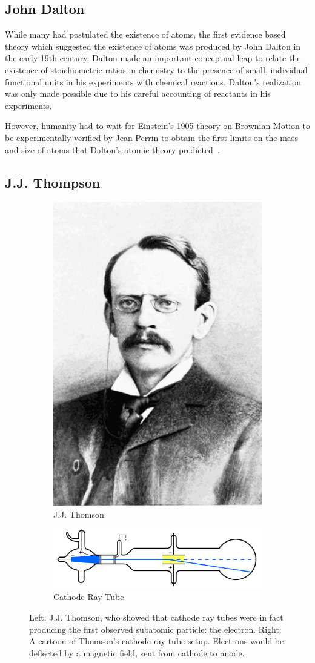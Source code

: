 \subsection{John Dalton}

While many had postulated the existence of atoms, the first evidence based
theory which suggested the existence of atoms was produced by John Dalton in the
early 19th century. Dalton made an important conceptual leap to relate the
existence of stoichiometric ratios in chemistry to the presence of small,
individual functional units in his experiments with chemical reactions.
Dalton's realization was only made possible due to his careful accounting of
reactants in his experiments.

However, humanity had to wait for Einstein's 1905 theory on Brownian Motion to
be experimentally verified by Jean Perrin to obtain the first limits on the mass
and size of atoms that Dalton's atomic theory predicted~\cite{Patterson200750}.

\subsection{J.J. Thompson}

\begin{figure}[ht]
	\centering
	\begin{subfigure}{.4\textwidth}
		\centering
		\includegraphics[width=0.4\linewidth]{./figures/jjthomson.png}
		\caption{J.J. Thomson  \cite{PopularScience1899}}
		\label{fig:thomsonportrait}
	\end{subfigure}%
	\begin{subfigure}{0.6\textwidth}
		\centering
		\includegraphics[width=0.4\linewidth]{./figures/cathoderaytube.png}
		\caption{Cathode Ray Tube  \cite{Kurzon2010}}
		\label{fig:thomsoncathode}
	\end{subfigure}
	\caption{ 
		Left: J.J. Thomson, who showed that cathode ray tubes were in fact producing
		the first observed subatomic particle: the electron. Right: A cartoon of
		Thomson's cathode ray tube setup. Electrons would be deflected by a magnetic
		field, sent from cathode to anode.
	}
	\label{fig:jjthomson}
\end{figure}

